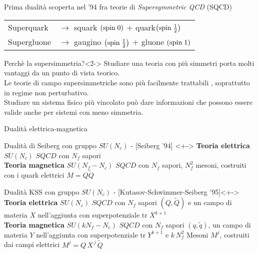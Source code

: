 \documentclass[10pt,compress]{beamer}
\begin{document}
\begin{frame}
Prima dualità scoperta nel '94 fra teorie di \emph{Supersymmetric QCD} (SQCD)
\begin{table}
\begin{tabular}{l l}
Superquark \quad & $\longrightarrow$ \quad squark $\left( \hbox{spin} \;  0 \right)$ + quark$\left (\hbox{spin} \;  \frac{1}{2} \right)$ \\
Supergluone \quad &  $\longrightarrow$ \quad gaugino $\left (\hbox{spin} \;  \frac{1}{2} \right)$ + gluone  $\left( \hbox{spin} \;  1 \right)$ \\
\end{tabular}
\end{table}

\begin{block}{Perchè la supersimmetria?}<2->
Studiare una teoria con più simmetri porta molti vantaggi da un punto di vista teorico.\\
\vspace{0.3cm}
Le teorie di campo supersimmetriche sono più facilmente trattabili , soprattutto in regime \alert{non perturbativo}.\\
\vspace{0.3cm}
Studiare un sistema fisico più vincolato può dare \alert{informazioni} che possono essere valide anche per sistemi \alert{con meno simmetria}.  
\end{block}


\end{frame}



\begin{frame}{Dualità elettrica-magnetica}

\begin{block}{Dualità di Seiberg con gruppo $SU(N_c)$ - [Seiberg '94] }<+->
{\bfseries  Teoria elettrica}  \quad $SU(N_c)$  $SQCD$ con $N_f$ sapori \\[0.1cm]
{\bfseries   Teoria magnetica} \quad   $SU(N_f - N_c)$  $SQCD$ con $N_f$ sapori,  $N_f^2$  mesoni,   costruiti con i \alert{quark elettrici} $M = Q\tilde{Q}$\\
\end{block}

\vspace{0.5cm}


\begin{block}{Dualità KSS con gruppo $SU(N_c)$ - [Kutasov-Schwimmer-Seiberg '95]}<+->
{\bfseries  Teoria elettrica}  \quad $SU(N_c)$  $SQCD$ con $N_f$ sapori $(Q,\tilde{Q})$ e un campo di materia $X$ nell'aggiunta con superpotenziale $\mathrm{tr} \; X^{k+1}$\\[0.1cm]
{\bfseries  Teoria magnetica}  \quad $SU(k N_f - N_c)$  $SQCD$ con $N_f$ sapori $(q,\tilde{q})$, un campo di materia $Y$ nell'aggiunta con superpotenziale $\mathrm{tr}\; Y^{k+1}$ e  $ k \, N_f^2$  Mesoni $M^j$, costruiti dai \alert{campi elettrici} $M^j = Q \, X^{\,j} \, \tilde{Q}$\\
\end{block}
\vfill 
\end{frame}
\end{document}
